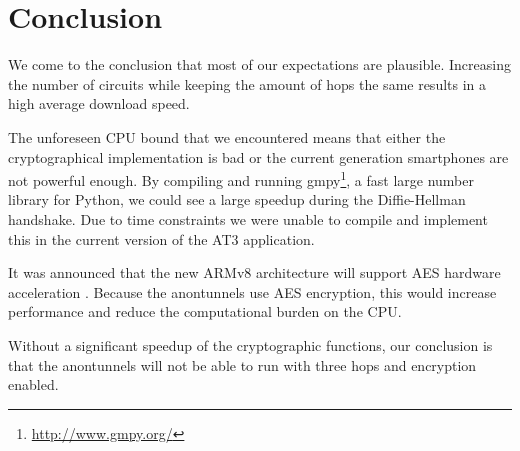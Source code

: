 \section{Conclusion}
\label{sec:experiments:conclusion}
	We come to the conclusion that most of our expectations are plausible. Increasing the number of circuits while keeping the amount of hops the same results in a high average download speed. %
	
	The unforeseen CPU bound that we encountered means that either the cryptographical implementation is bad or the current generation smartphones are not powerful enough. By compiling and running gmpy\footnote{\url{http://www.gmpy.org/}}, a fast large number library for Python, we could see a large speedup during the Diffie-Hellman handshake. Due to time constraints we were unable to compile and implement this in the current version of the AT3 application.
	
	It was announced that the new ARMv8 architecture will support AES hardware acceleration \cite{armv8anouncement}. Because the anontunnels use AES encryption, this would increase performance and reduce the computational burden on the CPU. %
	
	Without a significant speedup of the cryptographic functions, our conclusion is that the anontunnels will not be able to run with three hops and encryption enabled.